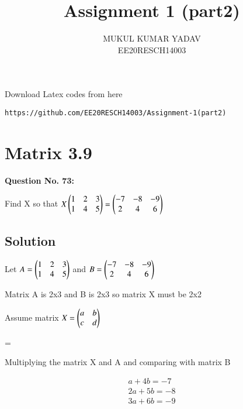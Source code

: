 \documentclass[journal,12pt,twocolumn]{IEEEtran}
\begin{document}
     \def\rightbox#1{\makebox[0in][r]{#1}}
     \def\centbox#1{\makebox[0in]{#1}}
     \def\topbox#1{\raisebox{-\baselineskip}[0in][0in]{#1}}
     \def\midbox#1{\raisebox{-0.5\baselineskip}[0in][0in]{#1}}
\vspace{3cm}
\title{Assignment 1 (part2)}
\author{MUKUL KUMAR YADAV\\ EE20RESCH14003}
\maketitle
\newpage
\bigskip
\renewcommand{\thefigure}{\theenumi}
\renewcommand{\thetable}{\theenumi}
 Download Latex codes from here
\begin{lstlisting}
https://github.com/EE20RESCH14003/Assignment-1(part2)
\end{lstlisting}
%

%

%
\section{\textbf{ Matrix 3.9}}
\textbf{Question No. 73:} 

Find X so that $X\begin{pmatrix}1&2&3\\1&4&5\end{pmatrix}=\begin{pmatrix}-7&-8&-9\\2&4&6\end{pmatrix}$

\subsection{\textbf{Solution}}


    
Let $A=\begin{pmatrix}1&2&3\\1&4&5\end{pmatrix}$ and $B=\begin{pmatrix}-7&-8&-9\\2&4&6\end{pmatrix}$

Matrix A is 2x3 and B is 2x3 so matrix X must be 2x2


Assume matrix $X=\begin{pmatrix}a&b\\c&d\end{pmatrix}$

=

Multiplying the matrix X and A and comparing with matrix B

\begin{align}\label{eq1}
a+4b=-7\\ 
2a+5b=-8\\ 
3a+6b=-9  
\end{align}
\end{document}
